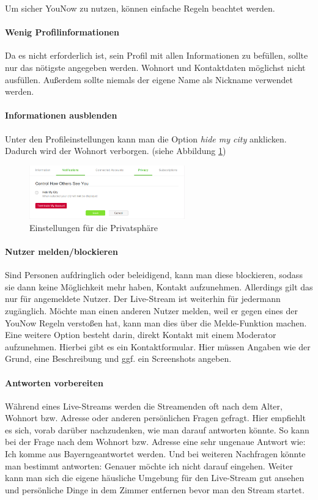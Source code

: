 Um sicher YouNow zu nutzen, können einfache Regeln beachtet werden. 

\paragraph{Wenig Profilinformationen}
Da es nicht erforderlich ist, sein Profil mit allen Informationen zu befüllen, sollte nur das nötigste angegeben werden. Wohnort und Kontaktdaten möglichst nicht ausfüllen. Außerdem sollte niemals der eigene Name als Nickname verwendet werden.


\paragraph{Informationen ausblenden}
Unter den Profileinstellungen kann man die Option \textit{hide my city} anklicken. Dadurch wird der Wohnort verborgen. (siehe Abbildung \ref{privats_einstellung})

\begin{figure}[!ht]
\centering
\includegraphics[width=0.6\textwidth]{./resources/younow_hide_my_city}
\caption{Einstellungen für die Privatsphäre}
\label{privats_einstellung}
\end{figure} 

\paragraph{Nutzer melden/blockieren}
Sind Personen aufdringlich oder beleidigend, kann man diese blockieren, sodass sie dann keine Möglichkeit mehr haben, Kontakt aufzunehmen. Allerdings gilt das nur für angemeldete Nutzer. Der Live-Stream ist weiterhin für jedermann zugänglich.
Möchte man einen anderen Nutzer melden, weil er gegen eines der YouNow Regeln verstoßen hat, kann man dies über die Melde-Funktion machen. Eine weitere Option besteht darin, direkt Kontakt mit einem Moderator aufzunehmen. Hierbei gibt es ein Kontaktformular. Hier müssen Angaben wie der Grund, eine Beschreibung und ggf. ein Screenshots angeben.

\paragraph{Antworten vorbereiten}
Während eines Live-Streams werden die Streamenden oft nach dem Alter, Wohnort bzw. Adresse oder anderen persönlichen Fragen gefragt. Hier empfiehlt es sich, vorab darüber nachzudenken, wie man darauf antworten könnte. So kann bei der Frage nach dem Wohnort bzw. Adresse eine sehr ungenaue Antwort wie: \glqq Ich komme aus Bayern\grqq geantwortet werden. Und bei weiteren Nachfragen könnte man bestimmt antworten: \glqq Genauer möchte ich nicht darauf eingehen\grqq .
Weiter kann man sich die eigene häusliche Umgebung für den Live-Stream gut ansehen und persönliche Dinge in dem Zimmer entfernen bevor man den Stream startet. 
